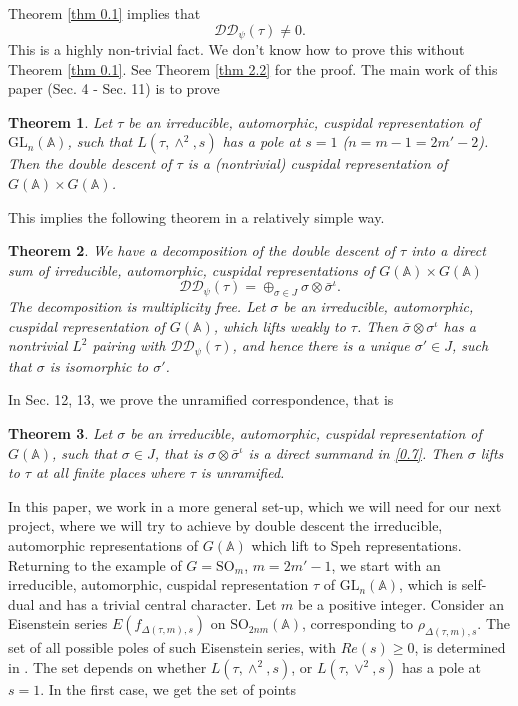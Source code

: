 \documentclass[12pts]{amsart}
\newcommand{\BA}{{\mathbb {A}}}
\newcommand{\GL}{{\mathrm{GL}}}
\newcommand{\SO}{{\mathrm{SO}}}
\newtheorem{thm}{Theorem}[section]
\begin{document}
Theorem \ref{thm 0.1} implies that  
$$
\mathcal{D}\mathcal{D}_\psi(\tau)\neq 0.
$$
 This is a highly non-trivial fact. We don't know how to prove this without Theorem \ref{thm 0.1}. See Theorem \ref{thm 2.2} for the proof. The main work of this paper (Sec. 4 - Sec. 11) is to prove
\begin{thm}\label{thm 0.2}
	Let $\tau$ be an irreducible, automorphic, cuspidal representation of $\GL_n(\BA)$, such that $L(\tau,\wedge^2,s)$ has a pole at $s=1$ ($n=m-1=2m'-2$). Then the double descent of $\tau$ is a (nontrivial) cuspidal representation of $G(\BA)\times G(\BA)$.
\end{thm}
This implies the following theorem in a relatively simple way.
\begin{thm}\label{thm 0.3}
	We have a decomposition of the double descent of $\tau$ into a direct sum of irreducible, automorphic, cuspidal representations of $G(\BA)\times G(\BA)$ 
	\begin{equation}\label{0.7}
	\mathcal{D}\mathcal{D}_\psi(\tau)=\oplus_{\sigma\in J}\sigma\otimes\bar{\sigma}^\iota.
	\end{equation}
	The decomposition is multiplicity free. Let $\sigma$ be an irreducible, automorphic, cuspidal representation of $G(\BA)$, which lifts weakly to $\tau$. Then $\bar{\sigma}\otimes\sigma^\iota$ has a nontrivial $L^2$ pairing with $\mathcal{D}\mathcal{D}_\psi(\tau)$, and hence there is a unique $\sigma'\in J$, such that $\sigma$ is isomorphic to $\sigma'$.	
\end{thm}
In Sec. 12, 13, we prove the unramified correspondence, that is
\begin{thm}\label{thm 0.4}
Let $\sigma$ be an irreducible, automorphic, cuspidal representation of $G(\BA)$, such that $\sigma\in J$, that is $\sigma\otimes\bar{\sigma}^\iota$ is a direct summand in \eqref{0.7}. Then $\sigma$ lifts to $\tau$ at all finite places where $\tau$ is unramified.
\end{thm}
In this paper, we work in a more general set-up, which we will need for our next project, where we will try to achieve by double descent the irreducible, automorphic representations of $G(\BA)$ which lift to Speh representations. Returning to the example of $G=\SO_m$, $m=2m'-1$, we start with an irreducible, automorphic, cuspidal representation $\tau$ of $\GL_n(\BA)$, which is self-dual and has a trivial central character. Let $m$ be a positive integer. Consider an Eisenstein series $E(f_{\Delta(\tau,m),s})$ on $\SO_{2nm}(\BA)$, corresponding to $\rho_{\Delta(\tau,m),s}$. The set of all possible poles of such Eisenstein series, with $Re(s)\geq 0$, is determined in \cite{JLZ13}. The set depends on whether $L(\tau,\wedge^2,s)$, or $L(\tau,\vee^2,s)$ has a pole at $s=1$. In the first case, we get the set of points 
\end{document}
